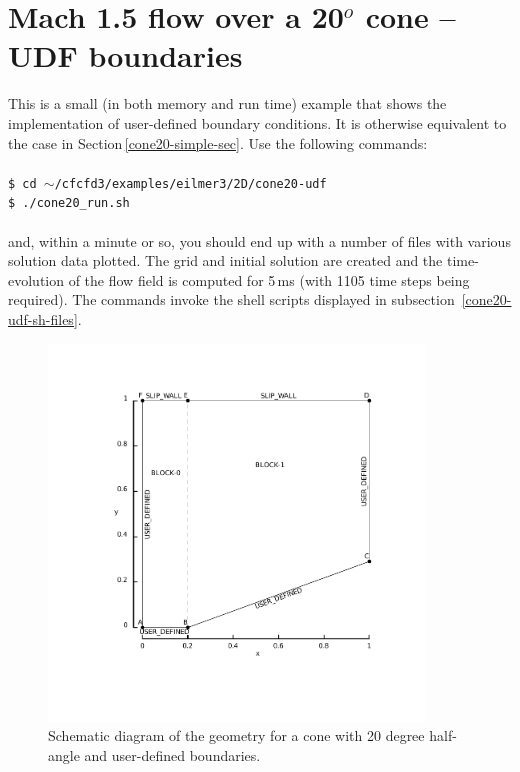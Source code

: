 
\section{Mach 1.5 flow over a 20$^o$ cone -- UDF boundaries}
\label{sec:cone20-udf}
%
This is a small (in both memory and run time) example 
that shows the implementation of user-defined boundary conditions.
It is otherwise equivalent to the case in Section\,\ref{cone20-simple-sec}.
Use the following commands:\\
%
\topbar\\
\texttt{\$ cd $\sim$/cfcfd3/examples/eilmer3/2D/cone20-udf}\\
\texttt{\$ ./cone20\_run.sh}\\
\bottombar\\
%
and, within a minute or so, you should end up with a number of files
with various solution data plotted.
The grid and initial solution are created and the time-evolution of the
flow field is computed for 5\,ms (with 1105 time steps being required).
The commands invoke the shell scripts displayed in 
subsection~\ref{cone20-udf-sh-files}.
%

\begin{figure}[htbp]
\begin{center}
\includegraphics[width=10cm, viewport=76 78 389 398]{../2D/cone20-udf/cone20_svg.pdf}
\end{center}
\caption{Schematic diagram of the geometry for a cone 
         with 20 degree half-angle and user-defined boundaries.}
\label{cone20-udf-geometry-fig}
\end{figure}

